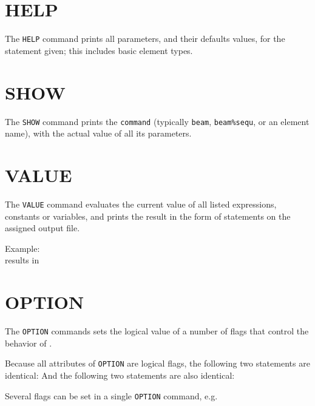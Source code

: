 \section{HELP}
\label{sec:help}
The \texttt{HELP} command prints all parameters, and their defaults
values, for the statement given; this includes basic element types.

\section{SHOW}
\label{sec:show}
The \texttt{SHOW} command prints the \texttt{command} (typically
\texttt{beam}, \texttt{beam\%sequ}, or an element name), with the actual
value of all its parameters.   

\section{VALUE}
\label{sec:value}
The \texttt{VALUE} command evaluates the current value of all listed
expressions, constants or variables, and prints the result in the form
of \madx statements on the assigned output file. 

Example: \\
results in 

\section{OPTION}
\label{sec:option}

The \texttt{OPTION} commands sets the logical value of a number of flags
that control the behavior of \madx.


Because all attributes of \texttt{OPTION} are logical flags, the
following two statements are identical:
And the following two statements are also identical:

Several flags can be set in a single \texttt{OPTION} command, e.g.

